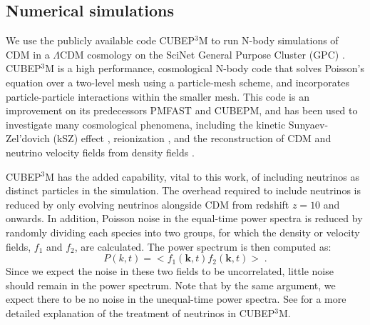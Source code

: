 \documentclass[twocolumn,superscriptaddress,prd]{revtex4}
\begin{document}
\subsection{Numerical simulations}
\label{sec:Numerics}

We use the publicly available code CUBEP$^3$M
\citep{harnois12} 
to run N-body simulations of CDM in a $\Lambda$CDM
cosmology on the SciNet General Purpose Cluster (GPC) \citep{GPC}.
CUBEP$^3$M is a high performance, cosmological N-body
code that
solves Poisson's equation over a two-level mesh using a particle-mesh
scheme, and incorporates particle-particle interactions within the
smaller mesh.  This code is an improvement on its predecessors 
PMFAST \citep{merz05}
and CUBEPM, and has been used to investigate many cosmological
phenomena, 
including 
the kinetic Sunyaev-Zel'dovich (kSZ) effect  \citep{park13,park15},
reionization \citep{iliev14,majumdar14}, and the 
reconstruction of CDM and neutrino velocity fields from density fields
\citep{inman15}.

CUBEP$^3$M has the added capability, vital to this work, of including
neutrinos as distinct particles in the simulation.  The
overhead required to include neutrinos is reduced by only evolving
neutrinos alongside CDM from redshift $z=10$ and
onwards.
In addition, Poisson noise in the equal-time power spectra is reduced
by randomly dividing each species into two groups, for which the
density or velocity fields, $f_1$ and $f_2$, are calculated.  
The power spectrum is
then computed as:
\begin{equation}
  P(k,t) = < f_1(\mathbf{k},t) f_2(\mathbf{k},t) > \;.
\end{equation}
Since we expect the noise in these two fields to be uncorrelated,
little noise should remain in the power spectrum.  Note that by the
same argument, we expect there to be no noise in the unequal-time
power spectra.
See \cite{inman15} for a more detailed explanation of the
treatment of neutrinos in CUBEP$^{3}$M.
\end{document}
